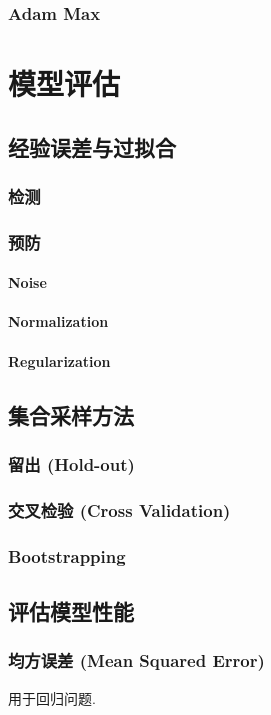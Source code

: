 \documentclass[oneside]{book}
\begin{document}
			\subsection{Adam Max }
			
		
		
	\chapter{模型评估}
		\section{经验误差与过拟合}
			\subsection{检测}
			\subsection{预防}
				\subsubsection{Noise}
				\subsubsection{Normalization}
				\subsubsection{Regularization}
		\section{集合采样方法}
			\subsection{留出 (Hold-out)}
			\subsection{交叉检验 (Cross Validation)}
			\subsection{Bootstrapping}
		\section{评估模型性能}
			\subsection{均方误差 (Mean Squared Error)}
				用于回归问题.
\end{document}
